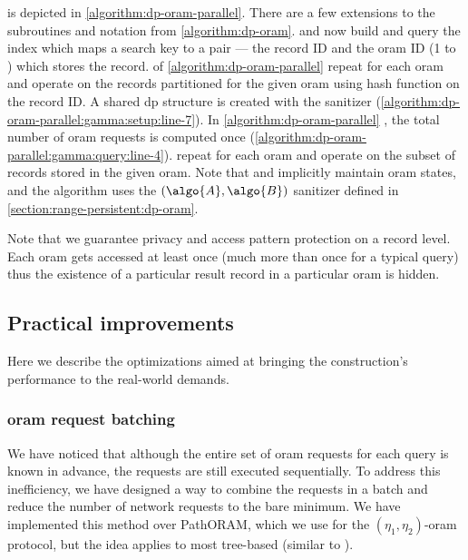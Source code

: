 		\protocolGamma{} is depicted in \cref{algorithm:dp-oram-parallel}.
		There are a few extensions to the subroutines and notation from \cref{algorithm:dp-oram}.
		 and  now build and query the index which maps a search key to a pair --- the record ID and the \acrshort{oram} ID (1 to \oramsNumber{}) which stores the record.
		 of \cref{algorithm:dp-oram-parallel} \protocolSetup{} repeat for each \acrshort{oram} and operate on the records partitioned for the given \acrshort{oram} using hash function  on the record ID\@.
		A shared \acrshort{dp} structure is created with the sanitizer  (\cref{algorithm:dp-oram-parallel:gamma:setup:line-7}).
		In \cref{algorithm:dp-oram-parallel} \protocolQuery{}, the total number of \acrshort{oram} requests is computed once (\cref{algorithm:dp-oram-parallel:gamma:query:line-4}).
		 repeat for each \acrshort{oram} and operate on the subset of records stored in the given \acrshort{oram}.
		Note that \user{} and \server{} implicitly maintain \oramsNumber{} \acrshort{oram} states, and the algorithm uses the $(\algo{A}, \algo{B})$ sanitizer defined in \cref{section:range-persistent:dp-oram}.

		Note that we guarantee privacy and access pattern protection on a record level.
		Each \acrshort{oram} gets accessed at least once (much more than once for a typical query) thus the existence of a particular result record in a particular \acrshort{oram} is hidden.

	\subsection{Practical improvements}\label{section:range-persistent:dp-improvements}

		Here we describe the optimizations aimed at bringing the construction's performance to the real-world demands.

		\subsubsection{\texorpdfstring{\acrshort{oram}}{ORAM} request batching}\label{section:range-persistent:dp-improvements:oram-batching}

			We have noticed that although the entire set of \acrshort{oram} requests for each query is known in advance, the requests are still executed sequentially.
			To address this inefficiency, we have designed a way to combine the requests in a batch and reduce the number of network requests to the bare minimum.
			We have implemented this method over PathORAM, which we use for the $(\eta_1, \eta_2)$-\acrshort{oram} protocol, but the idea applies to most tree-based  (similar to \cite{parallel-oram-improved}).

